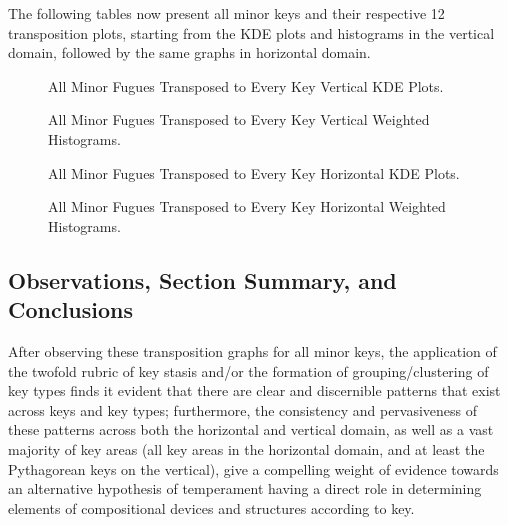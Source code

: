 The following tables now present all minor keys and their respective 12
transposition plots, starting from the KDE plots and histograms in the
vertical domain, followed by the same graphs in horizontal domain.




\begin{figure}[H]
\vspace{1.5em}
    \centering
    \caption{All Minor Fugues Transposed to Every Key Vertical KDE Plots. }
\end{figure}


\begin{figure}[H]
\vspace{1.5em}
    \centering
    \caption{All Minor Fugues Transposed to Every Key Vertical Weighted Histograms. }
\end{figure}


\begin{figure}[H]
\vspace{1.5em}
    \centering
    \caption{All Minor Fugues Transposed to Every Key Horizontal KDE Plots. }
\end{figure}


\begin{figure}[H]
\vspace{1.5em}
    \centering
    \caption{All Minor Fugues Transposed to Every Key Horizontal Weighted Histograms. }
\end{figure}    \subsection{Observations, Section Summary, and
Conclusions}\label{observations-section-summary-and-conclusions}

After observing these transposition graphs for all minor keys, the
application of the twofold rubric of key stasis and/or the formation of
grouping/clustering of key types finds it evident that there are clear
and discernible patterns that exist across keys and key types;
furthermore, the consistency and pervasiveness of these patterns across
both the horizontal and vertical domain, as well as a vast majority of
key areas (all key areas in the horizontal domain, and at least the
Pythagorean keys on the vertical), give a compelling weight of evidence
towards an alternative hypothesis of temperament having a direct role in
determining elements of compositional devices and structures according
to key.

